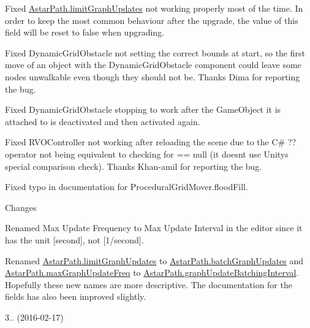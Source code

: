 \begin{DoxyItemize}
\begin{DoxyItemize}
\begin{DoxyItemize}
\item Fixed \mbox{\hyperlink{class_astar_path_ad81634e62019b66a8c2414b6b186e501}{Astar\+Path.\+limit\+Graph\+Updates}} not working properly most of the time. In order to keep the most common behaviour after the upgrade, the value of this field will be reset to false when upgrading.
\item Fixed Dynamic\+Grid\+Obstacle not setting the correct bounds at start, so the first move of an object with the Dynamic\+Grid\+Obstacle component could leave some nodes unwalkable even though they should not be. Thanks Dima for reporting the bug.
\item Fixed Dynamic\+Grid\+Obstacle stopping to work after the Game\+Object it is attached to is deactivated and then activated again.
\item Fixed R\+V\+O\+Controller not working after reloading the scene due to the C\# \textquotesingle{}??\textquotesingle{} operator not being equivalent to checking for \textquotesingle{}== null\textquotesingle{} (it doesn\textquotesingle{}t use Unity\textquotesingle{}s special comparison check). Thanks Khan-\/amil for reporting the bug.
\item Fixed typo in documentation for Procedural\+Grid\+Mover.\+flood\+Fill.
\end{DoxyItemize}
\item Changes
\begin{DoxyItemize}
\item Renamed \textquotesingle{}Max Update Frequency\textquotesingle{} to \textquotesingle{}Max Update Interval\textquotesingle{} in the editor since it has the unit \mbox{[}second\mbox{]}, not \mbox{[}1/second\mbox{]}.
\item Renamed \mbox{\hyperlink{class_astar_path_ad81634e62019b66a8c2414b6b186e501}{Astar\+Path.\+limit\+Graph\+Updates}} to \mbox{\hyperlink{class_astar_path_a5db862f4ebf5c7d71fbacfb9625f24ee}{Astar\+Path.\+batch\+Graph\+Updates}} and \mbox{\hyperlink{class_astar_path_a3398d8c7c4aaadf7fdc57c2c213a9fdf}{Astar\+Path.\+max\+Graph\+Update\+Freq}} to \mbox{\hyperlink{class_astar_path_ae485e075f508464fe3ec27761dd52d7d}{Astar\+Path.\+graph\+Update\+Batching\+Interval}}. Hopefully these new names are more descriptive. The documentation for the fields has also been improved slightly.
\end{DoxyItemize}
\end{DoxyItemize}
\item 3.. (2016-\/02-\/17)
\begin{DoxyItemize}

\end{DoxyItemize}
\end{DoxyItemize}

